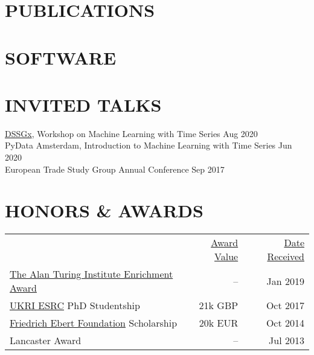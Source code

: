 \documentclass{cv}
\newcommand{\printbibsection}[2]{
\begin{refsection}
\nocite{*}
\printbibliography[sorting=chronological,
                  type={#1},
                  title={#2},
                  heading=none]
\end{refsection}
}
\begin{document}
\section{PUBLICATIONS}
\printbibsection{article}{}

\section{SOFTWARE}
\printbibsection{misc}{}

\section{INVITED TALKS}

\href{https://www.datascienceforsocialgood.org}{DSSGx}, Workshop on Machine Learning with Time Series \hfill Aug 2020 \\

PyData Amsterdam, Introduction to Machine Learning with Time Series \hfill Jun 2020 \\

European Trade Study Group Annual Conference \hfill Sep 2017 \\

\section{HONORS \& AWARDS}

\noindent
\begin{tabularx}{\textwidth}{@{}lrr}
& \underline{Award Value} & \underline{Date Received} \\
\href{https://www.turing.ac.uk/work-turing/studentships/enrichment}{The Alan Turing Institute Enrichment Award} & -- & Jan 2019 \\
\href{https://esrc.ukri.org}{UKRI ESRC} PhD Studentship & 21k GBP & Oct 2017 \\
\href{https://www.fes.de}{Friedrich Ebert Foundation} Scholarship & 20k EUR & Oct 2014 \\
Lancaster Award & -- & Jul 2013 \\
\end{tabularx}


\end{document}
